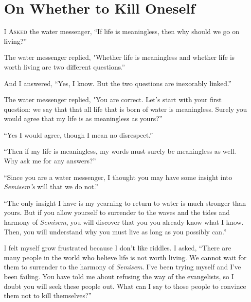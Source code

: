 \documentclass[12pt, letterpaper]{report}
\begin{document}
\chapter{On Whether to Kill Oneself}

\vspace{1\baselineskip}
I A\textsc{sked} the water messenger, ``If life is meaningless, then why should we go on living?''

\vspace{1\baselineskip}
The water messenger replied, "Whether life is meaningless and whether life is worth living are two different questions.''

\vspace{1\baselineskip}
And I answered, ``Yes, I know. But the two questions are inexorably linked.''

\vspace{1\baselineskip}
The water messenger replied, "You are correct. Let's start with your first question: we say that that all life that is born of water is meaningless. Surely you would agree that my life is as meaningless as yours?''

\vspace{1\baselineskip}
``Yes I would agree, though I mean no disrespect.''

\vspace{1\baselineskip}
``Then if my life is meaningless, my words must surely be meaningless as well. Why ask me for any answers?''

\vspace{1\baselineskip}
``Since you are a water messenger, I thought you may have some insight into \textit{Semisem's} will that we do not.''

\vspace{1\baselineskip}
``The only insight I have is my yearning to return to water is much stronger than yours. But if you allow yourself to surrender to the waves and the tides and harmony of \textit{Semisem}, you will discover that you you already know what I know. Then, you will understand why you must live as long as you possibly can.''

\vspace{1\baselineskip}
I felt myself grow frustrated because I don't like riddles. I asked, ``There are many people in the world who believe life is not worth living. We cannot wait for them to surrender to the harmony of \textit{Semisem}. I've been trying myself and I've been failing. You have told me about refusing the way of the evangelists, so I doubt you will seek these people out. What can I say to those people to convince them not to kill themselves?''
\end{document}
